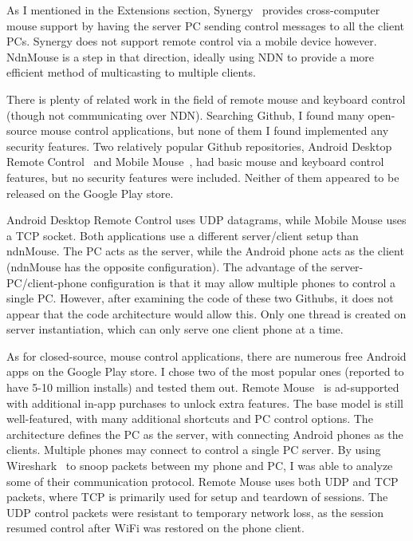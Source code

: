 \documentclass{sig-alternate}
\renewcommand\_{\textunderscore\allowbreak}  %
\begin{document}
As I mentioned in the Extensions section, Synergy~\cite{synergy} provides cross-computer mouse support by having the server PC sending control messages to all the client PCs. Synergy does not support remote control via a mobile device however. NdnMouse is a step in that direction, ideally using NDN to provide a more efficient method of multicasting to multiple clients.

There is plenty of related work in the field of remote mouse and keyboard control (though not communicating over NDN). Searching Github, I found many open-source mouse control applications, but none of them I found implemented any security features. Two relatively popular Github repositories, Android Desktop Remote Control~\cite{justintaylor} and Mobile Mouse~\cite{mobilemouse}, had basic mouse and keyboard control features, but no security features were included. Neither of them appeared to be released on the Google Play store. 

Android Desktop Remote Control uses UDP datagrams, while Mobile Mouse uses a TCP socket. Both applications use a different server/client setup than ndnMouse. The PC acts as the server, while the Android phone acts as the client (ndnMouse has the opposite configuration). The advantage of the server-PC/client-phone configuration is that it may allow multiple phones to control a single PC. However, after examining the code of these two Githubs, it does not appear that the code architecture would allow this. Only one thread is created on server instantiation, which can only serve one client phone at a time.

As for closed-source, mouse control applications, there are numerous free Android apps on the Google Play store. I chose two of the most popular ones (reported to have 5-10 million installs) and tested them out. Remote Mouse~\cite{remotemouse} is ad-supported with additional in-app purchases to unlock extra features. The base model is still well-featured, with many additional shortcuts and PC control options. The architecture defines the PC as the server, with connecting Android phones as the clients. Multiple phones may connect to control a single PC server. By using Wireshark~\cite{wireshark} to snoop packets between my phone and PC, I was able to analyze some of their communication protocol. Remote Mouse uses both UDP and TCP packets, where TCP is primarily used for setup and teardown of sessions. The UDP control packets were resistant to temporary network loss, as the session resumed control after WiFi was restored on the phone client. 
\end{document}
